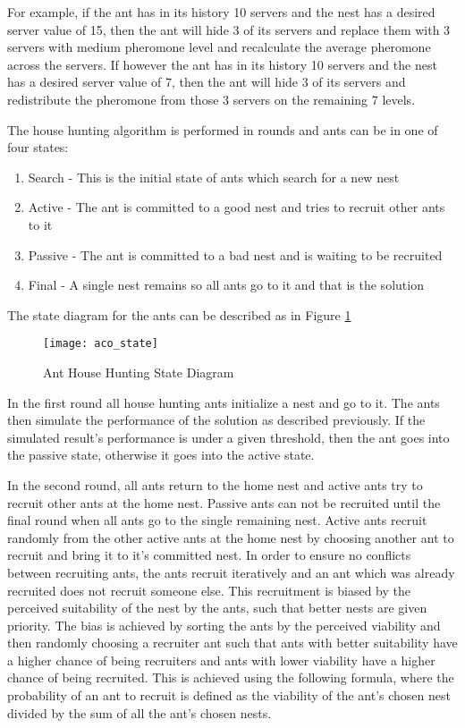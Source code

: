 For example, if the ant has in its history 10 servers and the nest has a desired server value of 15, then the ant will hide 3 of its servers and replace them with 3 servers with medium pheromone level and recalculate the average pheromone across the servers. If however the ant has in its history 10 servers and the nest has a desired server value of 7, then the ant will hide 3 of its servers and redistribute the pheromone from those 3 servers on the remaining 7 levels.

The house hunting algorithm is performed in rounds and ants can be in one of four states:

\begin{enumerate}
	\item Search - This is the initial state of ants which search for a new nest
	\item Active - The ant is committed to a good nest and tries to recruit other ants to it
	\item Passive - The ant is committed to a bad nest and is waiting to be recruited
	\item Final - A single nest remains so all ants go to it and that is the solution
\end{enumerate}

The state diagram for the ants can be described as in Figure \ref{fig:anthousehuntingstate}

\begin{figure}
	\centering
	\texttt{[image: aco\_state]}
	\caption{Ant House Hunting State Diagram}
	\label{fig:anthousehuntingstate}
\end{figure}

In the first round all house hunting ants initialize a nest and go to it. The ants then simulate the performance of the solution as described previously. If the simulated result's performance is under a given threshold, then the ant goes into the passive state, otherwise it goes into the active state.

In the second round, all ants return to the home nest and active ants try to recruit other ants at the home nest. Passive ants can not be recruited until the final round when all ants go to the single remaining nest. Active ants recruit randomly from the other active ants at the home nest by choosing another ant to recruit and bring it to it's committed nest. In order to ensure no conflicts between recruiting ants, the ants recruit iteratively and an ant which was already recruited does not recruit someone else. This recruitment is biased by the perceived suitability of the nest by the ants, such that better nests are given priority. The bias is achieved by sorting the ants by the perceived viability and then randomly choosing a recruiter ant such that ants with better suitability have a higher chance of being recruiters and ants with lower viability have a higher chance of being recruited. This is achieved using the following formula, where the probability of an ant to recruit is defined as the viability of the ant's chosen nest divided by the sum of all the ant's chosen nests.

